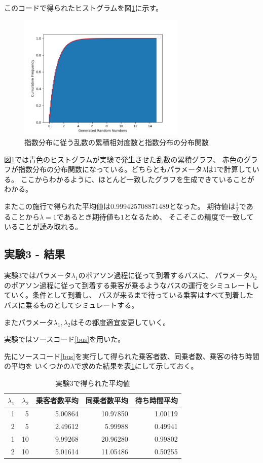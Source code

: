 \documentclass[a4paper,11pt,dvipdfmx]{jsarticle}
\begin{document}
このコードで得られたヒストグラムを図\ref{expohist}に示す。
\begin{figure}[ht]
\centering
\includegraphics[width=80mm]{Exporand.png}
\caption{指数分布に従う乱数の累積相対度数と指数分布の分布関数}
\label{expohist}
\end{figure}

図\ref{expohist}では青色のヒストグラムが実験で発生させた乱数の累積グラフ、
赤色のグラフが指数分布の分布関数になっている。どちらともパラメータ$\lambda$は$1$で計算している。
ここからわかるように、ほとんど一致したグラフを生成できていることがわかる。

またこの施行で得られた平均値は0.999425708871489となった。
期待値は$\frac{1}{\lambda}$であることから$\lambda=1$であるとき期待値も$1$となるため、
そこそこの精度で一致していることが読み取れる。

\subsection{実験3 - 結果}
実験3ではパラメータ$\lambda_1$のポアソン過程に従って到着するバスに、
パラメータ$\lambda_2$のポアソン過程に従って到着する乗客が乗るようなバスの運行をシミュレートしていく。条件として到着し、
バスが来るまで待っている乗客はすべて到着したバスに乗るものとしてシミュレートする。

またパラメータ$\lambda_1,\lambda_2$はその都度適宜変更していく。

実験ではソースコード\ref{bus}を用いた。


先にソースコード\ref{bus}を実行して得られた乗客者数、同乗者数、乗客の待ち時間の平均を
いくつかの$\lambda$で求めた結果を表\ref{result}にして示しておく。
\begin{table}[ht]
    \centering
    \caption{実験3で得られた平均値}
    \begin{tabular}{|r|r|r|r|r|} \hline
        $\lambda_1$ & $\lambda_2$ & 乗客者数平均 & 同乗者数平均 & 待ち時間平均 \\ \hline
        1 & 5  & 5.00864 & 10.97850 & 1.00119 \\ \hline
        2 & 5  & 2.49612 & 5.99988  & 0.49941 \\ \hline
        1 & 10 & 9.99268 & 20.96280 & 0.99802 \\ \hline
        2 & 10 & 5.01614 & 11.05486 & 0.50255 \\ \hline
    \end{tabular}
    \label{result}
\end{table}
\end{document}
